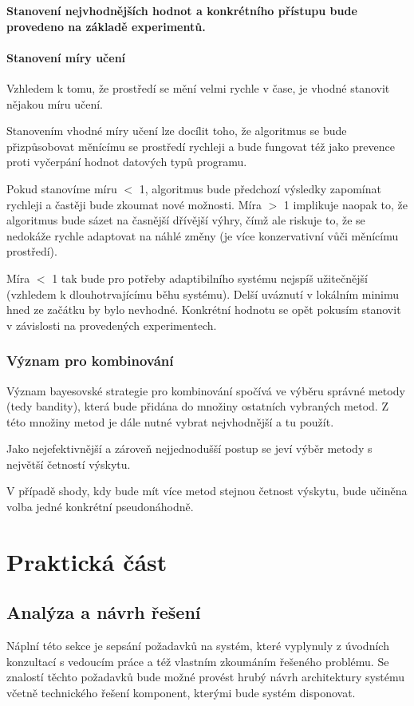 \documentclass[thesis=M,czech]{FITthesis}[2014/05/07]
\begin{document}
\textbf{Stanovení nejvhodnějších hodnot a konkrétního přístupu bude provedeno na základě experimentů.}

\subsubsection{Stanovení míry učení}
\label{rate}
Vzhledem k tomu, že prostředí se mění velmi rychle v čase, je vhodné stanovit nějakou míru učení. 

Stanovením vhodné míry učení lze docílit toho, že algoritmus se bude přizpůsobovat měnícímu se prostředí rychleji a bude fungovat též jako prevence proti vyčerpání hodnot datových typů programu.

Pokud stanovíme míru $<$ 1, algoritmus bude předchozí výsledky zapomínat rychleji a častěji bude zkoumat nové možnosti. Míra $>$ 1 implikuje naopak to, že algoritmus bude sázet na časnější dřívější výhry, čímž ale riskuje to, že se nedokáže rychle adaptovat na náhlé změny (je více konzervativní vůči měnícímu prostředí).

Míra $<$ 1 tak bude pro potřeby adaptibilního systému nejspíš užitečnější (vzhledem k dlouhotrvajícímu běhu systému). Delší uváznutí v lokálním minimu hned ze začátku by bylo nevhodné. Konkrétní hodnotu se opět pokusím stanovit v závislosti na provedených experimentech.

\subsection{Význam pro kombinování}
\label{lkombinování}
Význam bayesovské strategie pro kombinování spočívá ve výběru správné metody (tedy bandity), která bude přidána do množiny ostatních vybraných metod. Z této množiny metod je dále nutné vybrat nejvhodnější a tu použít.

Jako nejefektivnější a zároveň nejjednodušší postup se jeví výběr metody s největší četností výskytu. 

V případě shody, kdy bude mít více metod stejnou četnost výskytu, bude učiněna volba jedné konkrétní pseudonáhodně.

\chapter{Praktická část}
\label{chap:prakt}
\section{Analýza a návrh řešení}
\label{chap:analysis}
Náplní této sekce je sepsání požadavků na systém, které vyplynuly z úvodních konzultací s vedoucím práce a též vlastním zkoumáním řešeného problému. Se znalostí těchto požadavků bude možné provést hrubý návrh architektury systému včetně technického řešení komponent, kterými bude systém disponovat.
\end{document}
